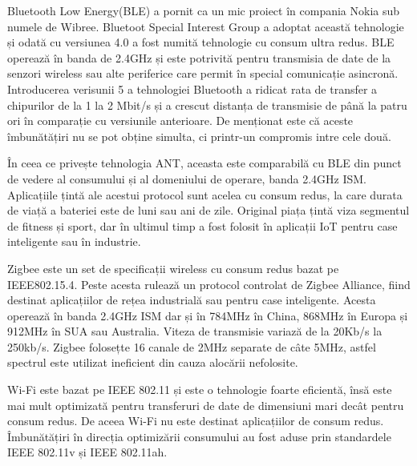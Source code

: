 \documentclass[12pt,a4paper]{report}
\begin{document}
Bluetooth Low Energy(BLE) a pornit ca un mic proiect în compania Nokia sub numele de Wibree. Bluetoot Special Interest Group a adoptat această tehnologie și odată cu versiunea 4.0 a fost numită tehnologie cu consum ultra redus. BLE operează în banda de 2.4GHz și este potrivită pentru transmisia de date de la senzori wireless sau alte periferice care permit în special comunicație asincronă. Introducerea verisunii 5 a tehnologiei Bluetooth a ridicat rata de transfer a chipurilor de la 1 la 2 Mbit/s și a crescut distanța de transmisie de până la patru ori în comparație cu versiunile anterioare. De menționat este că aceste îmbunătățiri nu se pot obține simulta, ci printr-un compromis intre cele două.

În ceea ce privește tehnologia ANT, aceasta este comparabilă cu BLE din punct de vedere al consumului și al domeniului de operare, banda 2.4GHz ISM. Aplicațiile țintă ale acestui protocol sunt acelea cu consum redus, la care durata de viață a bateriei este de luni sau ani de zile. Original piața țintă viza segmentul de fitness și sport, dar în ultimul timp a fost folosit în aplicații IoT pentru case inteligente sau în industrie.

Zigbee este un set de specificații wireless cu consum redus bazat pe IEEE802.15.4. Peste acesta rulează un protocol controlat de Zigbee Alliance, fiind destinat aplicațiilor de rețea industrială sau pentru case inteligente. Acesta operează în banda 2.4GHz ISM dar și în 784MHz în China, 868MHz în Europa și 912MHz în SUA sau Australia. Viteza de transmisie variază de la 20Kb/s la 250kb/s. Zigbee folosețte 16 canale de 2MHz separate de câte 5MHz, astfel spectrul este utilizat ineficient din cauza alocării nefolosite.

Wi-Fi este bazat pe IEEE 802.11 și este o tehnologie foarte eficientă, însă este mai mult optimizată pentru transferuri de date de dimensiuni mari decât pentru consum redus. De aceea Wi-Fi nu este destinat aplicațiilor de consum redus. Îmbunătățiri în direcția optimizării consumului au fost aduse prin standardele IEEE 802.11v și IEEE 802.11ah.
\end{document}
